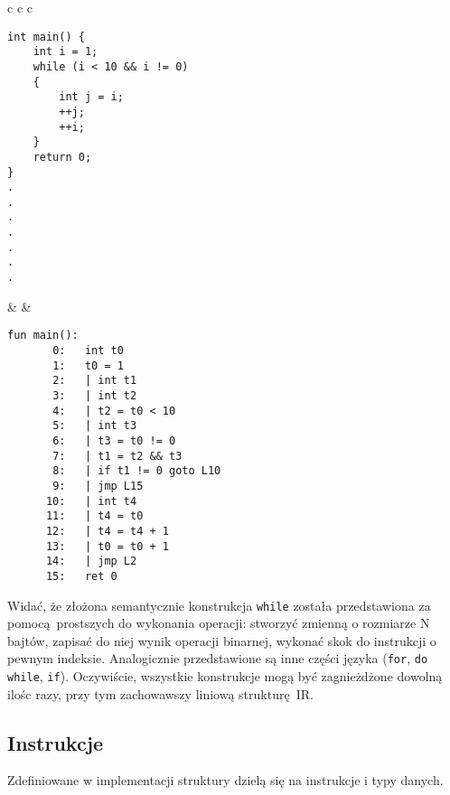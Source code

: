 \documentclass[leqno, 12pt]{article}
\begin{document}
			\begin{center}
			\begin{tabular}{ c c c }
\begin{lstlisting}[label={lst:warn-unused-var},linewidth=6.5cm]
int main() {
    int i = 1;
    while (i < 10 && i != 0)
    {
        int j = i;
        ++j;
        ++i;
    }
    return 0;
}			
.
.
.
.
.
.
.
\end{lstlisting}
			& &	
\begin{lstlisting}[label={lst:warn-unused-var},linewidth=8cm]
fun main():
       0:   int t0
       1:   t0 = 1
       2:   | int t1
       3:   | int t2
       4:   | t2 = t0 < 10
       5:   | int t3
       6:   | t3 = t0 != 0
       7:   | t1 = t2 && t3
       8:   | if t1 != 0 goto L10
       9:   | jmp L15
      10:   | int t4
      11:   | t4 = t0
      12:   | t4 = t4 + 1
      13:   | t0 = t0 + 1
      14:   | jmp L2
      15:   ret 0
\end{lstlisting}
			\end{tabular}
			\end{center}
			
			Widać, że złożona semantycznie konstrukcja \texttt{while} została
			przedstawiona za pomocą prostszych do wykonania operacji: stworzyć
			zmienną o rozmiarze N bajtów, zapisać do niej wynik operacji binarnej,
			wykonać skok do instrukcji o pewnym indeksie. Analogicznie przedstawione są
			inne części języka (\texttt{for}, \texttt{do while}, \texttt{if}). Oczywiście,
			wszystkie konstrukcje mogą być zagnieżdżone dowolną ilośc razy, przy tym
			zachowawszy liniową strukturę IR.

		\subsection{Instrukcje}

		Zdefiniowane w implementacji struktury dzielą się
		na instrukcje i typy danych.
\end{document}
